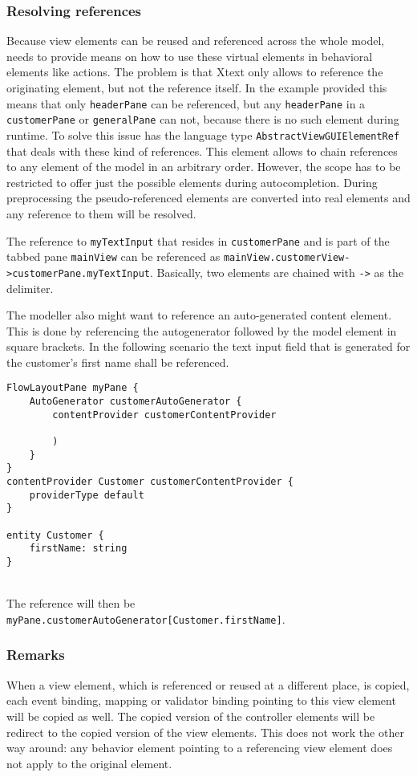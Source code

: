 \subsubsection{Resolving references}
Because view elements can be reused and referenced across the whole model, \MD needs to provide means on how to use these virtual elements in behavioral elements like actions. The problem is that Xtext only allows to reference the originating element, but not the reference itself. In the example provided this means that only \lstinline!headerPane! can be referenced, but any \lstinline!headerPane! in a \lstinline!customerPane! or \lstinline!generalPane! can not, because there is no such element during runtime. To solve this issue \MD has the language type \lstinline!AbstractViewGUIElementRef! that deals with these kind of references. This element allows to chain references to any element of the model in an arbitrary order. However, the scope has to be restricted to offer just the possible elements during autocompletion. During preprocessing the pseudo-referenced elements are converted into real elements and any reference to them will be resolved.

The reference to \lstinline!myTextInput! that resides in \lstinline!customerPane! and is part of the tabbed pane \lstinline!mainView! can be referenced as \lstinline!mainView.customerView->customerPane.myTextInput!. Basically, two elements are chained with \lstinline!->! as the delimiter.

The modeller also might want to reference an auto-generated content element. This is done by referencing the autogenerator followed by the model element in square brackets. In the following scenario the text input field that is generated for the customer’s first name shall be referenced.

\begin{lstlisting}[language=MD2]
FlowLayoutPane myPane {
	AutoGenerator customerAutoGenerator {
		contentProvider customerContentProvider
		
		)
	}
}
contentProvider Customer customerContentProvider {
	providerType default
}

entity Customer {
	firstName: string
}
\end{lstlisting}
~
\\
The reference will then be \lstinline!myPane.customerAutoGenerator[Customer.firstName]!.

\subsubsection{Remarks}
When a view element, which is referenced or reused at a different place, is copied, each event binding, mapping or validator binding pointing to this view element will be copied as well. The copied version of the controller elements will be redirect to the copied version of the view elements. This does not work the other way around: any behavior element pointing to a referencing view element does not apply to the original element.

